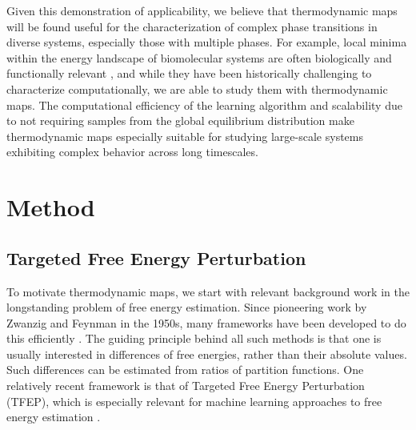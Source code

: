 \documentclass[9pt,twocolumn,twoside]{pnas-new}
\begin{document}
Given this demonstration of applicability, we believe that thermodynamic maps will be found useful for the characterization of complex phase transitions in diverse systems, especially those with multiple phases. For example, local minima within the energy landscape of biomolecular systems are often biologically and functionally relevant \cite{excited-states}, and while they have been historically challenging to characterize computationally, we are able to study them with thermodynamic maps. The computational efficiency of the learning algorithm and scalability due to not requiring samples from the global equilibrium distribution make thermodynamic maps especially suitable for studying large-scale systems exhibiting complex behavior across long timescales.


\section*{Method}



\subsection{Targeted Free Energy Perturbation}
\label{sec:TFEP}



To motivate thermodynamic maps, we start with relevant background work in the longstanding problem of free energy estimation. Since pioneering work by Zwanzig and Feynman in the 1950s, many frameworks have been developed to do this efficiently \cite{zwanzig-fep,feynman,TI,mbar,bar}. The guiding principle behind all such methods is that one is usually interested in differences of free energies, rather than their absolute values. Such differences can be estimated from ratios of partition functions.
One relatively recent framework is that of Targeted Free Energy Perturbation (TFEP), which is especially relevant for machine learning approaches to free energy estimation \cite{TFEP}. 
\end{document}
